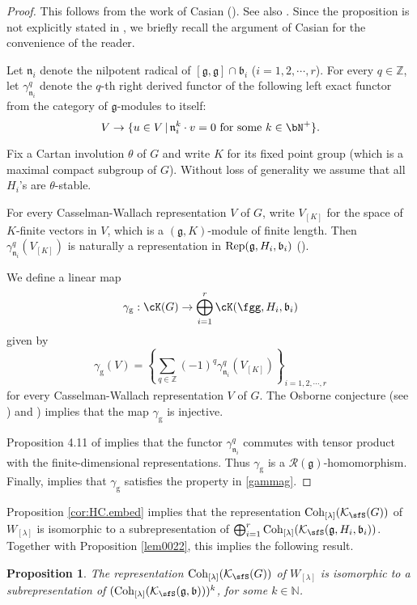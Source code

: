\documentclass[12pt,a4paper]{amsart}
\newcommand{\BN}{{\mathbb {N}}}
\newcommand{\CK}{{\mathcal {K}}}
\newcommand{\g}{\mathfrak g}
\renewcommand{\b}{\mathfrak b}
\newcommand{\n}{\mathfrak n}
\newcommand{\Z}{\mathbb{Z}}
\numberwithin{equation}{section}
\newtheorem{prop}[thm]{Proposition}
\theoremstyle{remark}
\def\Coh{\mathrm{Coh}}
\newcommand{\Lam}{{[\lambda]}}
\newcommand{\Grt}{\cK}
\begin{document}
\begin{proof}
This follows from the work of Casian (\cite{Cas}). See also {\cite{Mc}}. Since the proposition is not explicitly stated in \cite{Cas}, we briefly recall the argument of Casian for the convenience of the reader.



 Let $\n_i$ denote the nilpotent radical of $[\g,\g]\cap \b_i$ ($i=1,2, \cdots,r$).
 For every $q\in \Z$, let $\gamma_{\n_i}^q$ denote the $q$-th right derived functor of the following left exact functor from the category of $\g$-modules to itself:
 \[
   V\rightarrow \{u\in V\,|\, \n_i^k \cdot v=0\textrm{ for some $k\in \bN^+$}\}.
 \]

Fix a Cartan involution $\theta$ of $G$ and write $K$ for its fixed point group (which is a maximal compact subgroup of $G$).  Without loss of generality we assume that all $H_i$'s are $\theta$-stable.

For every Casselman-Wallach representation $V$ of $G$, write $V_{[K]}$ for the space of $K$-finite vectors in $V$, which is a $(\g,K)$-module of finite length. Then   $\gamma_{\n_i}^q(V_{[K]})$ is naturally a representation in $\Rep(\g, H_i, \b_i)$ (\cite[Corollary 4.9]{Cas}).

We define a linear map
 \[
\gamma_{\mathrm g}: \Grt(G)\rightarrow  \bigoplus_{i=1}^{r} \Grt(\fgg,H_{i},\b_{i})
 \]
 given by
 \[
   \gamma_{\mathrm g}(V)= \left\{\sum_{q\in \Z} (-1)^{q} \gamma^{q}_{\n_i}(V_{[K]})\right\}_{i=1,2, \cdots, r}
 \]
for every Casselman-Wallach representation $V$ of $G$. The Osborne conjecture (see \cite[Theorem 3.1]{Cas}) and \cite[Corollary 4.9]{Cas}) implies that the map $\gamma_{\mathrm g}$ is injective.

Proposition 4.11 of \cite{Cas} implies that the functor $\gamma_{\n_i}^q$ commutes with tensor product with the finite-dimensional representations. Thus $\gamma_{\mathrm g}$ is a $\mathcal R(\g)$-homomorphism. Finally, \cite[Corollary 4.15]{Cas} implies that $\gamma_{\mathrm g}$ satisfies the property in \eqref{gammag}.
\end{proof}




Proposition \ref{cor:HC.embed} implies that the representation $\Coh_{\Lam}(\CK_\sfS(G))$ of $W_{[\lambda]}$ is isomorphic to a subrepresentation of
$\bigoplus_{i=1}^r \Coh_{\Lam}(\CK_{\sfS}(\g,H_i,\b_i))$. Together with Proposition \ref{lem0022}, this implies the following result.

 \begin{prop}\label{lem0033}
The representation $\Coh_{\Lam}(\CK_\sfS(G))$  of $W_{[\lambda]}$ is isomorphic to a subrepresentation of $(\Coh_{\Lam}(\CK_\sfS(\g,\b)))^k$, for some $k\in \BN$.
     \end{prop}
\end{document}
